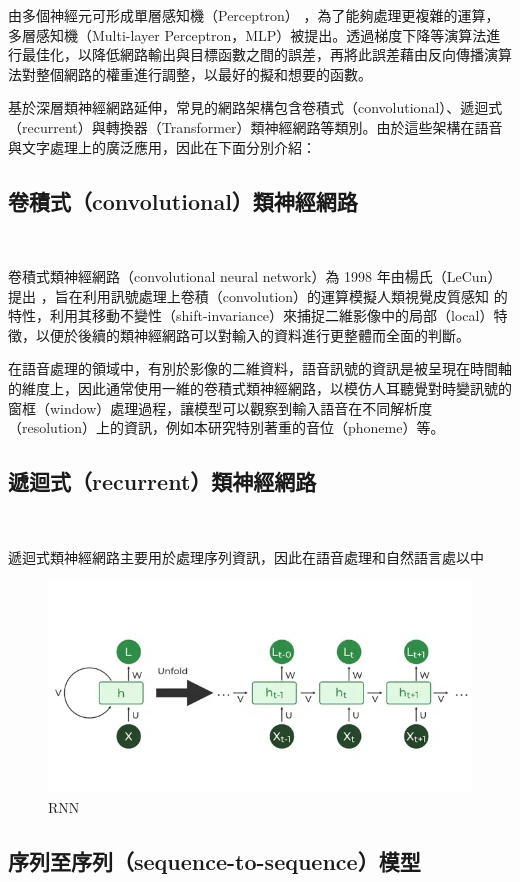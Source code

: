 由多個神經元可形成單層感知機（Perceptron） \cite{rosenblatt1958perceptron}，為了能夠處理更複雜的運算，多層感知機（Multi-layer Perceptron，MLP）被提出。透過梯度下降等演算法進行最佳化，以降低網路輸出與目標函數之間的誤差，再將此誤差藉由反向傳播演算法對整個網路的權重進行調整，以最好的擬和想要的函數。

基於深層類神經網路延伸，常見的網路架構包含卷積式（convolutional）、遞迴式（recurrent）與轉換器（Transformer）類神經網路等類別。由於這些架構在語音與文字處理上的廣泛應用，因此在下面分別介紹：

\subsection{卷積式（convolutional）類神經網路}　　

卷積式類神經網路（convolutional neural network）為 1998 年由楊氏（LeCun）提出 \cite{726791}，旨在利用訊號處理上卷積（convolution）的運算模擬人類視覺皮質感知 \cite{hubel1959receptive} 的特性，利用其移動不變性（shift-invariance）來捕捉二維影像中的局部（local）特徵，以便於後續的類神經網路可以對輸入的資料進行更整體而全面的判斷。

在語音處理的領域中，有別於影像的二維資料，語音訊號的資訊是被呈現在時間軸的維度上，因此通常使用一維的卷積式類神經網路，以模仿人耳聽覺對時變訊號的窗框（window）處理過程，讓模型可以觀察到輸入語音在不同解析度（resolution）上的資訊，例如本研究特別著重的音位（phoneme）等。


\subsection{遞迴式（recurrent）類神經網路}　　

遞迴式類神經網路主要用於處理序列資訊，因此在語音處理和自然語言處以中

\begin{figure}
    \centering
    \includegraphics[width=0.5\linewidth]{figures/image.png}
    \caption{RNN}
    \label{fig:RNN}
\end{figure}

\subsection{序列至序列（sequence-to-sequence）模型}　　


